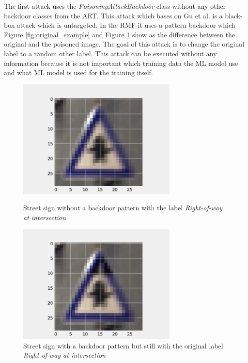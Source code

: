 The first attack uses the \textit{PoisoningAttackBackdoor} class without any other backdoor classes from the ART. This attack which bases on Gu et al. \cite{DBLP:journals/corr/abs-1708-06733} is a black-box attack which is untargeted. In the RMF it uses a pattern backdoor which Figure \ref{fig:original_example} and Figure \ref{fig:poisoned_example} show as the difference between the original and the poisoned image. The goal of this attack is to change the original label to a random other label. This attack can be executed without any information because it is not important which training data the ML model use and what ML model is used for the training itself.

\begin{figure}[!tbp]
  \centering
  \begin{minipage}[b]{0.4\textwidth}
    \includegraphics[width=8cm]{pictures/original_example.png}
    \caption{Street sign without a backdoor pattern with the label \textit{Right-of-way at intersection}}
    \label{fig:original_example}
  \end{minipage}
  \hfill
  \begin{minipage}[b]{0.4\textwidth}
    \includegraphics[width=8cm]{pictures/poisoned_example.png}
    \caption{Street sign with a backdoor pattern but still with the original label \textit{Right-of-way at intersection}}
    \label{fig:poisoned_example}
  \end{minipage}
\end{figure}

